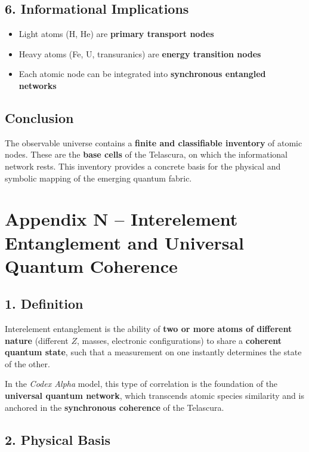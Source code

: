 \documentclass[12pt]{article}
\begin{document}
\subsection*{6. Informational Implications}

\begin{itemize}
    \item Light atoms (H, He) are \textbf{primary transport nodes}
    \item Heavy atoms (Fe, U, transuranics) are \textbf{energy transition nodes}
    \item Each atomic node can be integrated into \textbf{synchronous entangled networks}
\end{itemize}
\subsection*{Conclusion}

The observable universe contains a \textbf{finite and classifiable inventory} of atomic nodes. These are the \textbf{base cells} of the Telascura, on which the informational network rests. This inventory provides a concrete basis for the physical and symbolic mapping of the emerging quantum fabric.

\section*{Appendix N – Interelement Entanglement and Universal Quantum Coherence}

\subsection*{1. Definition}

Interelement entanglement is the ability of \textbf{two or more atoms of different nature} (different $Z$, masses, electronic configurations) to share a \textbf{coherent quantum state}, such that a measurement on one instantly determines the state of the other.

In the \textit{Codex Alpha} model, this type of correlation is the foundation of the \textbf{universal quantum network}, which transcends atomic species similarity and is anchored in the \textbf{synchronous coherence} of the Telascura.

\subsection*{2. Physical Basis}
\end{document}
